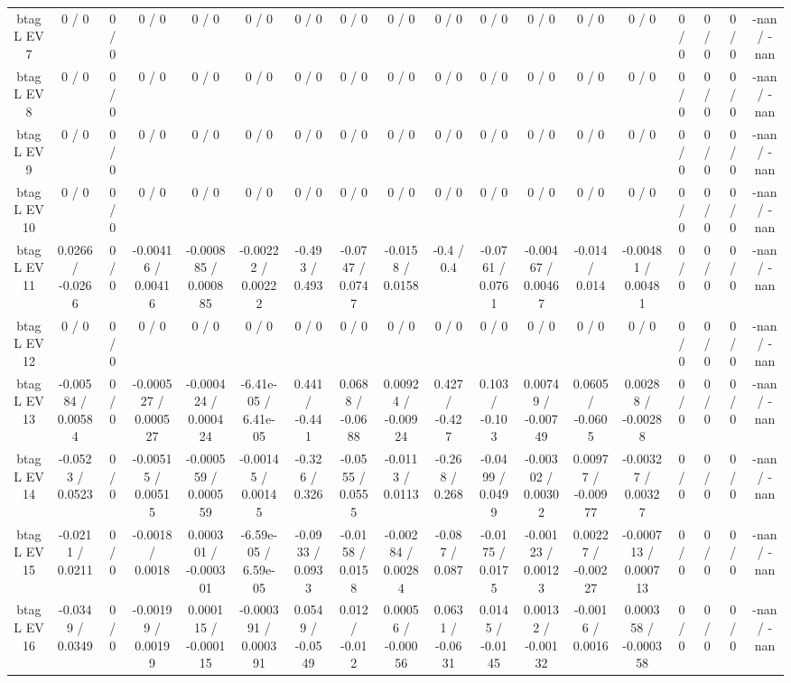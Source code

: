 \documentclass[10pt]{article}
\begin{document}
\begin{table}[htbp]
\begin{center}
\begin{tabular}{|c|c|c|c|c|c|c|c|c|c|c|c|c|c|c|c|c|c|}
  btag L EV 7 & 0 / 0 & 0 / 0 & 0 / 0 & 0 / 0 & 0 / 0 & 0 / 0 & 0 / 0 & 0 / 0 & 0 / 0 & 0 / 0 & 0 / 0 & 0 / 0 & 0 / 0 & 0 / 0 & 0 / 0 & 0 / 0 & -nan / -nan \\ 
  btag L EV 8 & 0 / 0 & 0 / 0 & 0 / 0 & 0 / 0 & 0 / 0 & 0 / 0 & 0 / 0 & 0 / 0 & 0 / 0 & 0 / 0 & 0 / 0 & 0 / 0 & 0 / 0 & 0 / 0 & 0 / 0 & 0 / 0 & -nan / -nan \\ 
  btag L EV 9 & 0 / 0 & 0 / 0 & 0 / 0 & 0 / 0 & 0 / 0 & 0 / 0 & 0 / 0 & 0 / 0 & 0 / 0 & 0 / 0 & 0 / 0 & 0 / 0 & 0 / 0 & 0 / 0 & 0 / 0 & 0 / 0 & -nan / -nan \\ 
  btag L EV 10 & 0 / 0 & 0 / 0 & 0 / 0 & 0 / 0 & 0 / 0 & 0 / 0 & 0 / 0 & 0 / 0 & 0 / 0 & 0 / 0 & 0 / 0 & 0 / 0 & 0 / 0 & 0 / 0 & 0 / 0 & 0 / 0 & -nan / -nan \\ 
  btag L EV 11 & 0.0266 / -0.0266 & 0 / 0 & -0.00416 / 0.00416 & -0.000885 / 0.000885 & -0.00222 / 0.00222 & -0.493 / 0.493 & -0.0747 / 0.0747 & -0.0158 / 0.0158 & -0.4 / 0.4 & -0.0761 / 0.0761 & -0.00467 / 0.00467 & -0.014 / 0.014 & -0.00481 / 0.00481 & 0 / 0 & 0 / 0 & 0 / 0 & -nan / -nan \\ 
  btag L EV 12 & 0 / 0 & 0 / 0 & 0 / 0 & 0 / 0 & 0 / 0 & 0 / 0 & 0 / 0 & 0 / 0 & 0 / 0 & 0 / 0 & 0 / 0 & 0 / 0 & 0 / 0 & 0 / 0 & 0 / 0 & 0 / 0 & -nan / -nan \\ 
  btag L EV 13 & -0.00584 / 0.00584 & 0 / 0 & -0.000527 / 0.000527 & -0.000424 / 0.000424 & -6.41e-05 / 6.41e-05 & 0.441 / -0.441 & 0.0688 / -0.0688 & 0.00924 / -0.00924 & 0.427 / -0.427 & 0.103 / -0.103 & 0.00749 / -0.00749 & 0.0605 / -0.0605 & 0.00288 / -0.00288 & 0 / 0 & 0 / 0 & 0 / 0 & -nan / -nan \\ 
  btag L EV 14 & -0.0523 / 0.0523 & 0 / 0 & -0.00515 / 0.00515 & -0.000559 / 0.000559 & -0.00145 / 0.00145 & -0.326 / 0.326 & -0.0555 / 0.0555 & -0.0113 / 0.0113 & -0.268 / 0.268 & -0.0499 / 0.0499 & -0.00302 / 0.00302 & 0.00977 / -0.00977 & -0.00327 / 0.00327 & 0 / 0 & 0 / 0 & 0 / 0 & -nan / -nan \\ 
  btag L EV 15 & -0.0211 / 0.0211 & 0 / 0 & -0.0018 / 0.0018 & 0.000301 / -0.000301 & -6.59e-05 / 6.59e-05 & -0.0933 / 0.0933 & -0.0158 / 0.0158 & -0.00284 / 0.00284 & -0.087 / 0.087 & -0.0175 / 0.0175 & -0.00123 / 0.00123 & 0.00227 / -0.00227 & -0.000713 / 0.000713 & 0 / 0 & 0 / 0 & 0 / 0 & -nan / -nan \\ 
  btag L EV 16 & -0.0349 / 0.0349 & 0 / 0 & -0.00199 / 0.00199 & 0.000115 / -0.000115 & -0.000391 / 0.000391 & 0.0549 / -0.0549 & 0.012 / -0.012 & 0.00056 / -0.00056 & 0.0631 / -0.0631 & 0.0145 / -0.0145 & 0.00132 / -0.00132 & -0.0016 / 0.0016 & 0.000358 / -0.000358 & 0 / 0 & 0 / 0 & 0 / 0 & -nan / -nan \\ 

\end{tabular}
\end{center}
\end{table}
\end{document}
